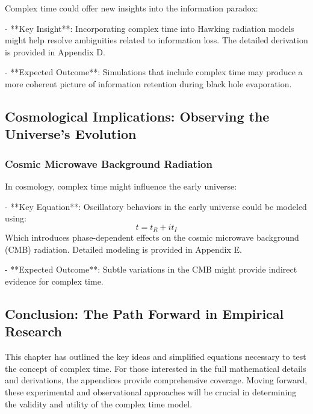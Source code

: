 \documentclass{article}
\begin{document}
Complex time could offer new insights into the information paradox:

- **Key Insight**: Incorporating complex time into Hawking radiation models might help resolve ambiguities related to information loss. The detailed derivation is provided in Appendix D.

- **Expected Outcome**: Simulations that include complex time may produce a more coherent picture of information retention during black hole evaporation.

\subsection{Cosmological Implications: Observing the Universe’s Evolution}

\subsubsection{Cosmic Microwave Background Radiation}

In cosmology, complex time might influence the early universe:

- **Key Equation**: Oscillatory behaviors in the early universe could be modeled using:
\[
t = t_R + i t_I
\]
Which introduces phase-dependent effects on the cosmic microwave background (CMB) radiation. Detailed modeling is provided in Appendix E.

- **Expected Outcome**: Subtle variations in the CMB might provide indirect evidence for complex time.

\subsection{Conclusion: The Path Forward in Empirical Research}

This chapter has outlined the key ideas and simplified equations necessary to test the concept of complex time. For those interested in the full mathematical details and derivations, the appendices provide comprehensive coverage. Moving forward, these experimental and observational approaches will be crucial in determining the validity and utility of the complex time model.
\end{document}
